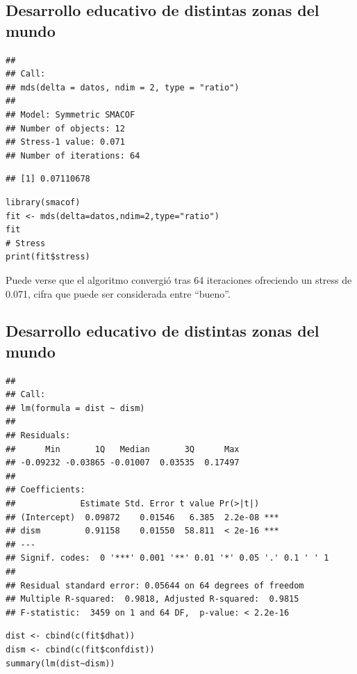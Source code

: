 \documentclass[]{article}
\begin{document}
\subsection{Desarrollo educativo de distintas zonas del
mundo}\label{desarrollo-educativo-de-distintas-zonas-del-mundo-5}

\hypertarget{left}{}
\begin{verbatim}
## 
## Call:
## mds(delta = datos, ndim = 2, type = "ratio")
## 
## Model: Symmetric SMACOF 
## Number of objects: 12 
## Stress-1 value: 0.071 
## Number of iterations: 64
\end{verbatim}

\begin{verbatim}
## [1] 0.07110678
\end{verbatim}

\hypertarget{right}{}
\begin{verbatim}
library(smacof)
fit <- mds(delta=datos,ndim=2,type="ratio")
fit
# Stress
print(fit$stress)
\end{verbatim}

Puede verse que el algoritmo convergió tras 64 iteraciones ofreciendo un
stress de 0.071, cifra que puede ser considerada entre ``bueno''.

\subsection{Desarrollo educativo de distintas zonas del
mundo}\label{desarrollo-educativo-de-distintas-zonas-del-mundo-6}

\hypertarget{left}{}
\begin{verbatim}
## 
## Call:
## lm(formula = dist ~ dism)
## 
## Residuals:
##      Min       1Q   Median       3Q      Max 
## -0.09232 -0.03865 -0.01007  0.03535  0.17497 
## 
## Coefficients:
##             Estimate Std. Error t value Pr(>|t|)    
## (Intercept)  0.09872    0.01546   6.385  2.2e-08 ***
## dism         0.91158    0.01550  58.811  < 2e-16 ***
## ---
## Signif. codes:  0 '***' 0.001 '**' 0.01 '*' 0.05 '.' 0.1 ' ' 1
## 
## Residual standard error: 0.05644 on 64 degrees of freedom
## Multiple R-squared:  0.9818, Adjusted R-squared:  0.9815 
## F-statistic:  3459 on 1 and 64 DF,  p-value: < 2.2e-16
\end{verbatim}

\hypertarget{right}{}
\begin{verbatim}
dist <- cbind(c(fit$dhat))
dism <- cbind(c(fit$confdist))
summary(lm(dist~dism))
\end{verbatim}
\end{document}
